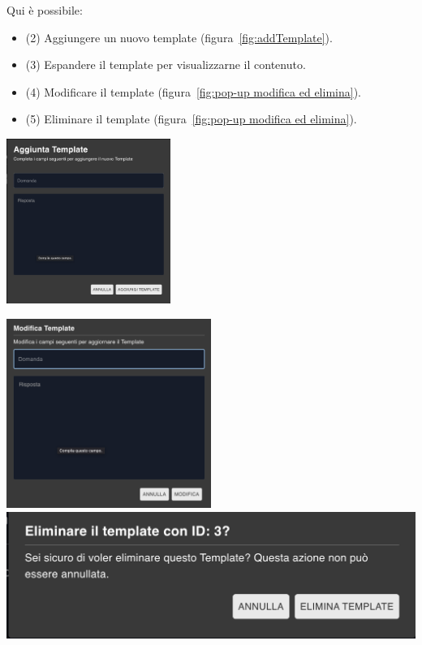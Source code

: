 Qui è possibile:
\begin{itemize}
    \item (2) Aggiungere un nuovo template (figura~\ref{fig:addTemplate}).
    \item (3) Espandere il template per visualizzarne il contenuto.
    \item (4) Modificare il template (figura~\ref{fig:pop-up modifica ed elimina}).
    \item (5) Eliminare il template (figura~\ref{fig:pop-up modifica ed elimina}).
\end{itemize}

\begin{center}
    \includegraphics[width=0.4\textwidth]{./img/AggiungiTemplate.png}
    \label{fig:addTemplate}
\end{center}

\begin{center}
    \includegraphics[width=0.5\textwidth]{./img/ModificaTemplate.png}
    \hspace{0.05\textwidth}
    \includegraphics[width=\textwidth]{./img/EliminaTemplate.png}
    \label{fig:pop-up modifica ed elimina}
\end{center}

